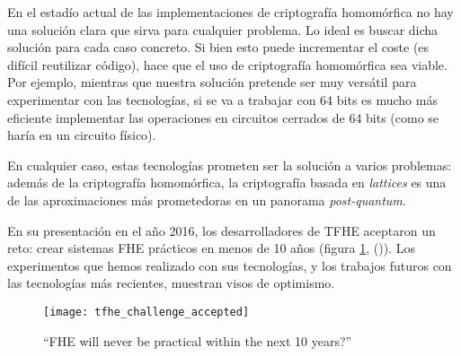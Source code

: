 En el estadío actual de las implementaciones de criptografía homomórfica no hay una solución clara que sirva para cualquier problema. Lo ideal es buscar dicha solución para cada caso concreto. Si bien esto puede incrementar el coste (es difícil reutilizar código), hace que el uso de criptografía homomórfica sea viable. Por ejemplo, mientras que nuestra solución pretende ser muy versátil para experimentar con las tecnologías, si se va a trabajar con 64 bits es mucho más eficiente implementar las operaciones en circuitos cerrados de 64 bits (como se haría en un circuito físico).

En cualquier caso, estas tecnologías prometen ser la solución a varios problemas: además de la criptografía homomórfica, la criptografía basada en \textit{lattices} es una de las aproximaciones más prometedoras en un panorama \textit{post-quantum}.

En su presentación en el año 2016, los desarrolladores de TFHE aceptaron un reto: crear sistemas FHE prácticos en menos de 10 años (figura \ref{fig:tfhe_challenge_accepted}, (\cite{chillotti_tfhe:_2016})). Los experimentos que hemos realizado con sus tecnologías, y los trabajos futuros con las tecnologías más recientes, muestran visos de optimismo.

\begin{figure}[h]
    \centering
    \texttt{[image: tfhe\_challenge\_accepted]}
    \caption{``FHE will never be practical within the next 10 years?''}
    \label{fig:tfhe_challenge_accepted}
\end{figure}
